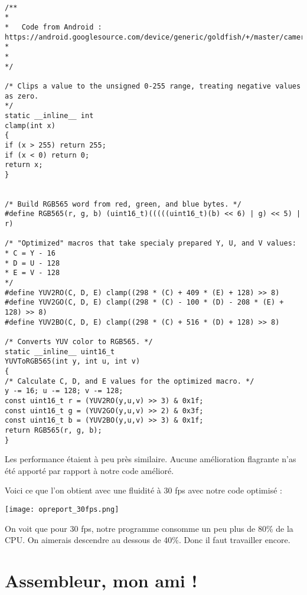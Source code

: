  
\begin{lstlisting}[frame=single,style=C]  % Start your code-block

/**
*
*	Code from Android : https://android.googlesource.com/device/generic/goldfish/+/master/camera/Converters.h
*
*
*/

/* Clips a value to the unsigned 0-255 range, treating negative values as zero.
*/
static __inline__ int
clamp(int x)
{
if (x > 255) return 255;
if (x < 0) return 0;
return x;
}


/* Build RGB565 word from red, green, and blue bytes. */
#define RGB565(r, g, b) (uint16_t)(((((uint16_t)(b) << 6) | g) << 5) | r)

/* "Optimized" macros that take specialy prepared Y, U, and V values:
* C = Y - 16
* D = U - 128
* E = V - 128
*/
#define YUV2RO(C, D, E) clamp((298 * (C) + 409 * (E) + 128) >> 8)
#define YUV2GO(C, D, E) clamp((298 * (C) - 100 * (D) - 208 * (E) + 128) >> 8)
#define YUV2BO(C, D, E) clamp((298 * (C) + 516 * (D) + 128) >> 8)

/* Converts YUV color to RGB565. */
static __inline__ uint16_t
YUVToRGB565(int y, int u, int v)
{
/* Calculate C, D, and E values for the optimized macro. */
y -= 16; u -= 128; v -= 128;
const uint16_t r = (YUV2RO(y,u,v) >> 3) & 0x1f;
const uint16_t g = (YUV2GO(y,u,v) >> 2) & 0x3f;
const uint16_t b = (YUV2BO(y,u,v) >> 3) & 0x1f;
return RGB565(r, g, b);
}
\end{lstlisting}

Les performance étaient à peu près similaire. Aucune amélioration flagrante n'as été  apporté par rapport à notre code amélioré.

\pagebreak Voici ce que l'on obtient avec une fluidité à 30 fps avec notre code optimisé :

\begin{center} 
\hspace{12.45cm}
\texttt{[image: opreport\_30fps.png]}
\end{center}
\vspace{0.5cm}

On voit que pour 30 fps, notre programme consomme un peu plus de 80\% de la CPU. On aimerais descendre au dessous de 40\%. Donc il faut travailler encore.



\pagebreak \section{Assembleur, mon ami !}

